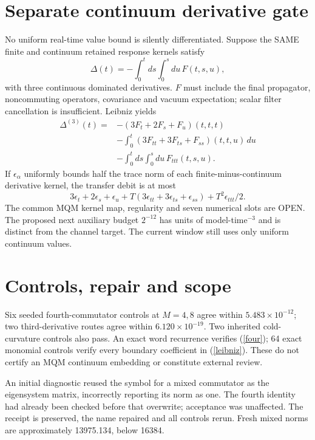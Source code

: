 \documentclass[a4paper,journal]{IEEEtran}
\begin{document}
\section{Separate continuum derivative gate}
No uniform real-time value bound is silently differentiated. Suppose the SAME finite and continuum retained response kernels satisfy
\begin{equation}\Delta(t)=-\int_0^t ds\int_0^s du\,F(t,s,u),
\end{equation}
with three continuous dominated derivatives. $F$ must include the final propagator, noncommuting operators, covariance and vacuum expectation; scalar filter cancellation is insufficient. Leibniz yields
\begin{align}
\Delta^{(3)}(t)={}&-(3F_t+2F_s+F_u)(t,t,t)\nonumber\\&-\int_0^t(3F_{tt}+3F_{ts}+F_{ss})(t,t,u)\,du\nonumber\\&-\int_0^t ds\int_0^s du\,F_{ttt}(t,s,u).\label{leibniz}
\end{align}
If $\epsilon_\alpha$ uniformly bounds half the trace norm of each finite-minus-continuum derivative kernel, the transfer debit is at most
\begin{equation}3\epsilon_t+2\epsilon_s+\epsilon_u+T(3\epsilon_{tt}+3\epsilon_{ts}+\epsilon_{ss})+T^2\epsilon_{ttt}/2.
\end{equation}
The common MQM kernel map, regularity and seven numerical slots are OPEN. The proposed next auxiliary budget $2^{-12}$ has units of model-time$^{-3}$ and is distinct from the channel target. The current window still uses only uniform continuum values.
\section{Controls, repair and scope}
Six seeded fourth-commutator controls at $M=4,8$ agree within $5.483\times10^{-12}$; two third-derivative routes agree within $6.120\times10^{-19}$. Two inherited cold-curvature controls also pass. An exact word recurrence verifies (\ref{four}); 64 exact monomial controls verify every boundary coefficient in (\ref{leibniz}). These do not certify an MQM continuum embedding or constitute external review.

An initial diagnostic reused the symbol for a mixed commutator as the eigensystem matrix, incorrectly reporting its norm as one. The fourth identity had already been checked before that overwrite; acceptance was unaffected. The receipt is preserved, the name repaired and all controls rerun. Fresh mixed norms are approximately 13975.134, below 16384.
\end{document}
